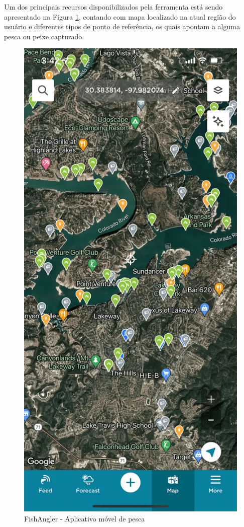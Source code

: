 Um dos principais recursos disponibilizados pela ferramenta está sendo apresentado na Figura \ref{fig:fishAnglerApp}, contando com mapa localizado na atual região do usuário e diferentes tipos de ponto de referência, os quais apontam a alguma pesca ou peixe capturado.

\begin{figure}[H]
    \centering
    \caption{FishAngler - Aplicativo móvel de pesca}
    \label{fig:fishAnglerApp}
    \includegraphics[scale=0.25]{./dados/figuras/fish-angler-app-map}
\end{figure}

